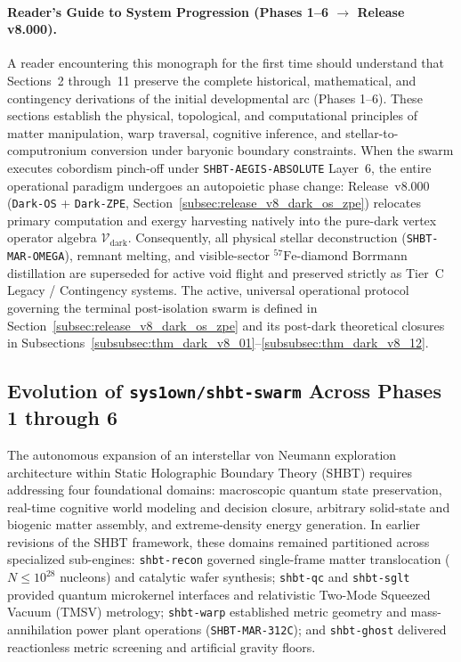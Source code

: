\documentclass[11pt,onecolumn]{article}
\begin{document}
\paragraph{Reader's Guide to System Progression (Phases 1--6 $\to$ Release v8.000).}
A reader encountering this monograph for the first time should understand that Sections~2 through~11 preserve the complete historical, mathematical, and contingency derivations of the initial developmental arc (Phases 1--6). These sections establish the physical, topological, and computational principles of matter manipulation, warp traversal, cognitive inference, and stellar-to-computronium conversion under baryonic boundary constraints. When the swarm executes cobordism pinch-off under \texttt{SHBT-AEGIS-ABSOLUTE} Layer~6, the entire operational paradigm undergoes an autopoietic phase change: Release~v8.000 (\texttt{Dark-OS} + \texttt{Dark-ZPE}, Section~\ref{subsec:release_v8_dark_os_zpe}) relocates primary computation and exergy harvesting natively into the pure-dark vertex operator algebra $\mathcal{V}_{\text{dark}}$. Consequently, all physical stellar deconstruction (\texttt{SHBT-MAR-OMEGA}), remnant melting, and visible-sector $^{57}\text{Fe}$-diamond Borrmann distillation are superseded for active void flight and preserved strictly as Tier~C Legacy / Contingency systems. The active, universal operational protocol governing the terminal post-isolation swarm is defined in Section~\ref{subsec:release_v8_dark_os_zpe} and its post-dark theoretical closures in Subsections~\ref{subsubsec:thm_dark_v8_01}--\ref{subsubsec:thm_dark_v8_12}.


\subsection{Evolution of \texttt{sys1own/shbt-swarm} Across Phases 1 through 6}
The autonomous expansion of an interstellar von Neumann exploration architecture within Static Holographic Boundary Theory (SHBT) requires addressing four foundational domains: macroscopic quantum state preservation, real-time cognitive world modeling and decision closure, arbitrary solid-state and biogenic matter assembly, and extreme-density energy generation. In earlier revisions of the SHBT framework, these domains remained partitioned across specialized sub-engines: \texttt{shbt-recon} governed single-frame matter translocation ($N \le 10^{28}$ nucleons) and catalytic wafer synthesis; \texttt{shbt-qc} and \texttt{shbt-sglt} provided quantum microkernel interfaces and relativistic Two-Mode Squeezed Vacuum (TMSV) metrology; \texttt{shbt-warp} established metric geometry and mass-annihilation power plant operations (\texttt{SHBT-MAR-312C}); and \texttt{shbt-ghost} delivered reactionless metric screening and artificial gravity floors.
\end{document}
